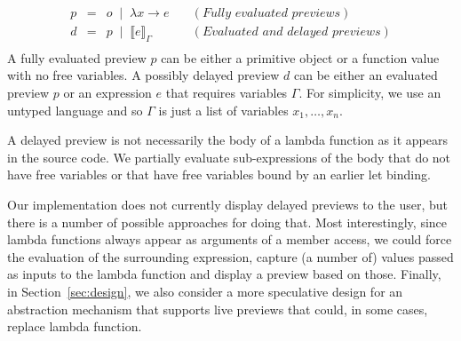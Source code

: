 \documentclass[acmsmall,anonymous,fleqn]{acmart}\settopmatter{printfolios=false,printccs=false,printacmref=false}
\theoremstyle{plain}
\theoremstyle{definition}
\newcommand{\lsep}{\;\;|\;\;}
\begin{document}
\begin{equation*}
\begin{array}{rcll}
p&=&o \lsep  \lambda x\rightarrow e&\quad(\textit{Fully evaluated previews})\\
d&=&p \lsep  \llbracket e \rrbracket_\Gamma&\quad(\textit{Evaluated and delayed previews})\\
\end{array}
\end{equation*}
%
A fully evaluated preview $p$ can be either a primitive object or a function value with no free
variables. A possibly delayed preview $d$ can be either an evaluated preview $p$ or an expression
$e$ that requires variables $\Gamma$. For simplicity, we use an untyped language and so $\Gamma$
is just a list of variables $x_1, \ldots, x_n$.

A delayed preview is not necessarily the body of a lambda function as it appears in the source
code. We partially evaluate sub-expressions of the body that do not have free variables or that
have free variables bound by an earlier let binding.

Our implementation does not currently display
delayed previews to the user, but there is a number of possible approaches for doing that.
Most interestingly, since lambda functions always appear as arguments of a member access, we could
force the evaluation of the surrounding expression, capture (a number of) values passed as inputs
to the lambda function and display a preview based on those. Finally, in Section~\ref{sec:design},
we also consider a more speculative design for an abstraction mechanism that supports live previews
that could, in some cases, replace lambda function.

\end{document}
